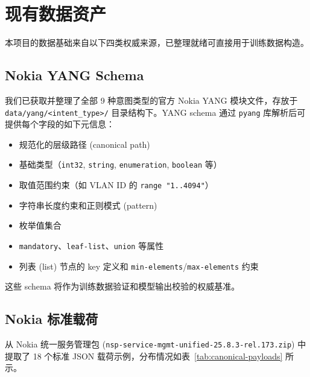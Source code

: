 \documentclass[12pt, a4paper]{article}
\newcommand{\filepath}[1]{\texttt{#1}}
\newcommand{\yang}{\textsc{YANG}}
\begin{document}
\section{现有数据资产}
\label{sec:data-assets}

本项目的数据基础来自以下四类权威来源，已整理就绪可直接用于训练数据构造。

\subsection{Nokia YANG Schema}

我们已获取并整理了全部 9 种意图类型的官方 Nokia \yang{} 模块文件，存放于 \filepath{data/yang/<intent\_type>/} 目录结构下。\yang{} schema 通过 \texttt{pyang} 库解析后可提供每个字段的如下元信息：

\begin{itemize}
  \item 规范化的层级路径 (canonical path)
  \item 基础类型（\texttt{int32}, \texttt{string}, \texttt{enumeration}, \texttt{boolean} 等）
  \item 取值范围约束（如 VLAN ID 的 \texttt{range "1..4094"}）
  \item 字符串长度约束和正则模式 (pattern)
  \item 枚举值集合
  \item \texttt{mandatory}、\texttt{leaf-list}、\texttt{union} 等属性
  \item 列表 (list) 节点的 key 定义和 \texttt{min-elements}/\texttt{max-elements} 约束
\end{itemize}

\noindent
这些 schema 将作为训练数据验证和模型输出校验的权威基准。

\subsection{Nokia 标准载荷}

从 Nokia 统一服务管理包 (\texttt{nsp-service-mgmt-unified-25.8.3-rel.173.zip}) 中提取了 18 个标准 JSON 载荷示例，分布情况如表~\ref{tab:canonical-payloads} 所示。
\end{document}

